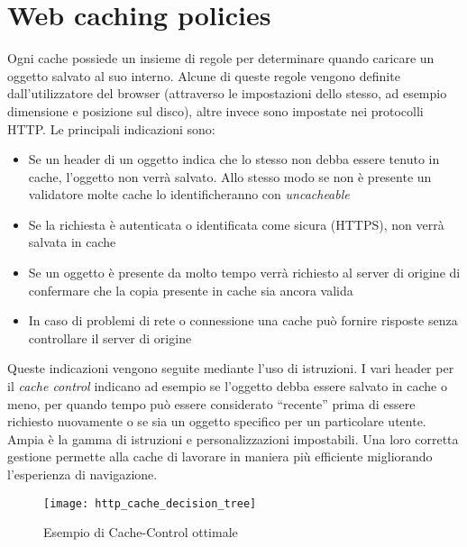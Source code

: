 \section{Web caching policies}

Ogni cache possiede un insieme di regole per determinare quando caricare un oggetto salvato al suo interno. Alcune di queste regole vengono definite dall'utilizzatore del browser (attraverso le impostazioni dello stesso, ad esempio dimensione e posizione sul disco), altre invece sono impostate nei protocolli HTTP.
Le principali indicazioni sono:

\begin{itemize}
	
	\item{Se un header di un oggetto indica che lo stesso non debba essere tenuto in cache, l'oggetto non verrà salvato. Allo stesso modo se non è presente un validatore molte cache lo identificheranno con \textit{uncacheable}}
	
	\item{Se la richiesta è autenticata o identificata come sicura (HTTPS), non verrà salvata in cache}
	
	\item{Se un oggetto è presente da molto tempo verrà richiesto al server di origine di confermare che la copia presente in cache sia ancora valida}
	
	\item{In caso di problemi di rete o connessione una cache può fornire risposte senza controllare il server di origine} 
	
\end{itemize}

Queste indicazioni vengono seguite mediante l'uso di istruzioni. I vari header per il \textit{cache control} indicano ad esempio se l'oggetto debba essere salvato in cache o meno, per quando tempo può essere considerato ``recente'' prima di essere richiesto nuovamente o se sia un oggetto specifico per un particolare utente. Ampia è la gamma di istruzioni e personalizzazioni impostabili. Una loro corretta gestione permette alla cache di lavorare in maniera più efficiente migliorando l'esperienza di navigazione.

\begin{figure}[htpb]
	\begin{center}
		\texttt{[image: http\_cache\_decision\_tree]}
	\end{center}
	\caption[Esempio di Cache-Control ottimale]{Esempio di Cache-Control ottimale \footnotemark}
\end{figure}


